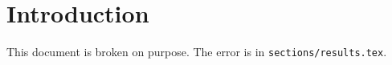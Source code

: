 \documentclass{article}
\begin{document}
\section{Introduction}
This document is broken on purpose. The error is in \texttt{sections/results.tex}.


\end{document}
